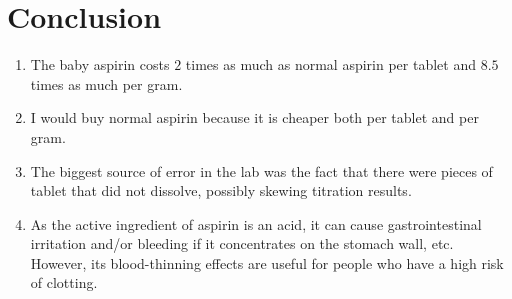 \documentclass[a4paper]{article}
\begin{document}
    \section{Conclusion}
        \begin{enumerate}
            \item The baby aspirin costs $2$ times as much as normal aspirin per tablet and $8.5$ times as much per gram.
            \item I would buy normal aspirin because it is cheaper both per tablet and per gram.
            \item The biggest source of error in the lab was the fact that there were pieces of tablet that did not dissolve,
            possibly skewing titration results.
            \item As the active ingredient of aspirin is an acid, it can cause gastrointestinal irritation and/or bleeding
            if it concentrates on the stomach wall, etc. However, its blood-thinning effects are useful for people who
            have a high risk of clotting.
        \end{enumerate}
\end{document}
